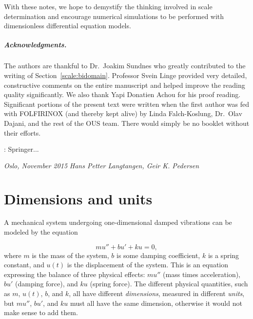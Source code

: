 \documentclass[graybox,envcountchap,sectrefs,final]{svmonodo}
\newcommand{\shortinlinecomment}[3]{{\color{red}{\bf #1}: #2}}
\begin{document}
With these notes, we hope to demystify the thinking involved in scale
determination and encourage numerical simulations to be performed with
dimensionless differential equation models.

\paragraph{Acknowledgments.}
The authors are thankful to Dr.~Joakim Sundnes who greatly contributed
to the writing of Section~\ref{scale:bidomain}. Professor Svein Linge
provided very detailed, constructive comments on the entire manuscript
and helped improve the reading quality significantly.  We also thank
Yapi Donatien Achou for his proof reading.  Significant portions of
the present text were written when the first author was fed with
FOLFIRINOX (and thereby kept alive) by Linda Falch-Koslung, Dr.~Olav
Dajani, and the rest of the OUS team. There would simply be no booklet
without their efforts.

\shortinlinecomment{hpl 1}{ Springer... }{ Springer... }

\vspace{1cm}

\noindent
{\it Oslo, November 2015}  \hfill  {\it Hans Petter Langtangen, Geir K. Pedersen}



\tableofcontents


\vspace{1cm} %

\mainmatter





\chapter{Dimensions and units}
\label{scale:dimunit}


A mechanical system undergoing one-dimensional damped vibrations can be
modeled by the equation

\begin{equation}
mu'' + bu' + ku = 0,
\label{scale:dimunit:eq:u}
\end{equation}
where $m$ is the mass of the system, $b$ is some damping coefficient,
$k$ is a spring constant, and $u(t)$ is the displacement of the
system.  This is an equation expressing the balance of three physical
effects: $mu''$ (mass times acceleration), $bu'$ (damping force), and
$ku$ (spring force).  The different physical quantities, such as $m$,
$u(t)$, $b$, and $k$, all have different \emph{dimensions}, measured in
different \emph{units}, but $mu''$, $bu'$, and $ku$ must all have the same
dimension, otherwise it would not make sense to add them.
\end{document}
